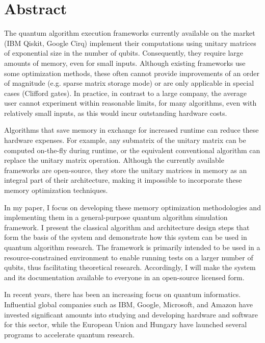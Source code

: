 \vfill
\selectenglish


\chapter*{Abstract}

The quantum algorithm execution frameworks currently available on the market (IBM Qiskit, Google Cirq) implement their computations using unitary matrices of exponential size in the number of qubits. Consequently, they require large amounts of memory, even for small inputs. Although existing frameworks use some optimization methods, these often cannot provide improvements of an order of magnitude (e.g. sparse matrix storage mode) or are only applicable in special cases (Clifford gates). In practice, in contrast to a large company, the average user cannot experiment within reasonable limits, for many algorithms, even with relatively small inputs, as this would incur outstanding hardware costs.

Algorithms that save memory in exchange for increased runtime can reduce these hardware expenses. For example, any submatrix of the unitary matrix can be computed on-the-fly during runtime, or the equivalent conventional algorithm can replace the unitary matrix operation. Although the currently available frameworks are open-source, they store the unitary matrices in memory as an integral part of their architecture, making it impossible to incorporate these memory optimization techniques.

In my paper, I focus on developing these memory optimization methodologies and implementing them in a general-purpose quantum algorithm simulation framework. I present the classical algorithm and architecture design steps that form the basis of the system and demonstrate how this system can be used in quantum algorithm research. The framework is primarily intended to be used in a resource-constrained environment to enable running tests on a larger number of qubits, thus facilitating theoretical research. Accordingly, I will make the system and its documentation available to everyone in an open-source licensed form.

In recent years, there has been an increasing focus on quantum informatics. Influential global companies such as IBM, Google, Microsoft, and Amazon have invested significant amounts into studying and developing hardware and software for this sector, while the European Union and Hungary have launched several programs to accelerate quantum research.

\vfill
\selectthesislanguage

\setcounter{romanPage}{\value{page}}
